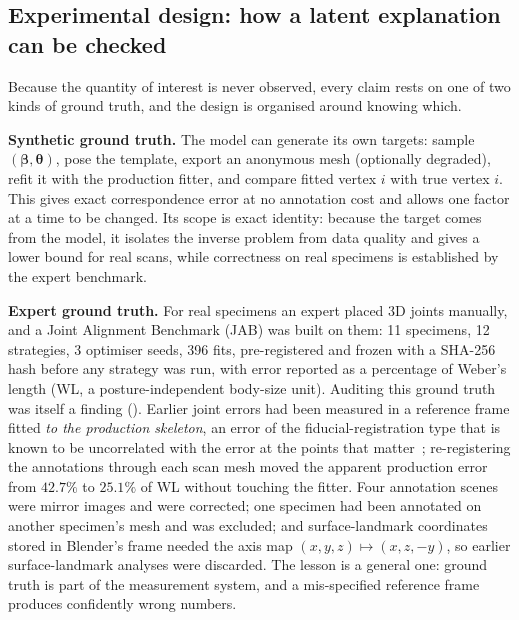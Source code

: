 \subsection{Experimental design: how a latent explanation can be checked}
\label{sec:method}

Because the quantity of interest is never observed, every claim rests on one of
two kinds of ground truth, and the design is organised around knowing which.

\textbf{Synthetic ground truth.} The model can generate its own targets: sample
$(\bm\beta,\bm\theta)$, pose the template, export an anonymous mesh
(optionally degraded), refit it with the production fitter, and compare fitted
vertex $i$ with true vertex $i$. This gives exact correspondence error at no
annotation cost and allows one factor at a time to be changed. Its scope is exact
identity: because the target comes from the model, it isolates the inverse
problem from data quality and gives a lower bound for real scans, while
correctness on real specimens is established by the expert benchmark.

\textbf{Expert ground truth.} For real specimens an expert placed 3D joints
manually, and a Joint Alignment Benchmark (JAB) was built on them: 11
specimens, 12 strategies, 3 optimiser seeds, 396 fits, pre-registered and
frozen with a SHA-256 hash before any strategy was run, with error reported as
a percentage of Weber's length (WL, a posture-independent body-size unit).
Auditing this ground truth was itself a finding (). Earlier joint errors
had been measured in a reference frame fitted \emph{to the production
skeleton}, an error of the fiducial-registration type that is known to be
uncorrelated with the error at the points that matter~\cite{fitzpatrick};
re-registering the annotations through each scan mesh moved the apparent
production error from $42.7\%$ to $25.1\%$ of WL without touching the fitter.
Four annotation scenes were mirror images and were corrected; one specimen
had been annotated on another specimen's mesh and was excluded; and
surface-landmark coordinates stored in Blender's frame needed the axis map
$(x,y,z)\mapsto(x,z,-y)$, so earlier surface-landmark analyses were discarded.
The lesson is a general one: ground truth is part of the measurement system, and
a mis-specified reference frame produces confidently wrong numbers.

